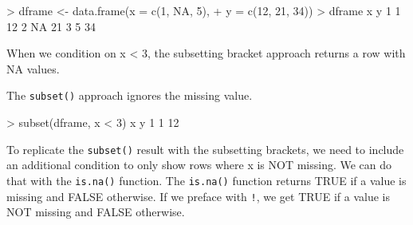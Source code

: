 \documentclass[
]{book}
\newenvironment{Shaded}{\begin{snugshade}}{\end{snugshade}}
\newcommand{\AttributeTok}[1]{\textcolor[rgb]{0.77,0.63,0.00}{#1}}
\newcommand{\ConstantTok}[1]{\textcolor[rgb]{0.00,0.00,0.00}{#1}}
\newcommand{\DecValTok}[1]{\textcolor[rgb]{0.00,0.00,0.81}{#1}}
\newcommand{\FunctionTok}[1]{\textcolor[rgb]{0.00,0.00,0.00}{#1}}
\newcommand{\NormalTok}[1]{#1}
\newcommand{\OtherTok}[1]{\textcolor[rgb]{0.56,0.35,0.01}{#1}}
\newcommand{\SpecialCharTok}[1]{\textcolor[rgb]{0.00,0.00,0.00}{#1}}
\begin{document}
\begin{Shaded}
\begin{Highlighting}[]
\SpecialCharTok{\textgreater{}}\NormalTok{ dframe }\OtherTok{\textless{}{-}} \FunctionTok{data.frame}\NormalTok{(}\AttributeTok{x =} \FunctionTok{c}\NormalTok{(}\DecValTok{1}\NormalTok{, }\ConstantTok{NA}\NormalTok{, }\DecValTok{5}\NormalTok{), }
\SpecialCharTok{+}                      \AttributeTok{y =} \FunctionTok{c}\NormalTok{(}\DecValTok{12}\NormalTok{, }\DecValTok{21}\NormalTok{, }\DecValTok{34}\NormalTok{))}
\SpecialCharTok{\textgreater{}}\NormalTok{ dframe}
\NormalTok{   x  y}
\DecValTok{1}  \DecValTok{1} \DecValTok{12}
\DecValTok{2} \ConstantTok{NA} \DecValTok{21}
\DecValTok{3}  \DecValTok{5} \DecValTok{34}
\end{Highlighting}
\end{Shaded}

When we condition on x \textless{} 3, the subsetting bracket approach returns a row with NA values.

\begin{Shaded}
\end{Shaded}

The \texttt{subset()} approach ignores the missing value.

\begin{Shaded}
\begin{Highlighting}[]
\SpecialCharTok{\textgreater{}} \FunctionTok{subset}\NormalTok{(dframe, x }\SpecialCharTok{\textless{}} \DecValTok{3}\NormalTok{)}
\NormalTok{  x  y}
\DecValTok{1} \DecValTok{1} \DecValTok{12}
\end{Highlighting}
\end{Shaded}

To replicate the \texttt{subset()} result with the subsetting brackets, we need to include an additional condition to only show rows where x is NOT missing. We can do that with the \texttt{is.na()} function. The \texttt{is.na()} function returns TRUE if a value is missing and FALSE otherwise. If we preface with \texttt{!}, we get TRUE if a value is NOT missing and FALSE otherwise.

\begin{Shaded}
\end{Shaded}
\end{document}
